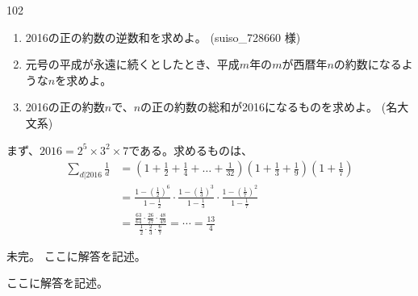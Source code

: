 \begin{prob}{102}{}{}
 \begin{enumerate}
  \item 2016の正の約数の逆数和を求めよ。  (suiso\_728660 様)
  \item 元号の平成が永遠に続くとしたとき、平成$m$年の$m$が西暦年$n$の約数になるような$n$を求めよ。 
  \item 2016の正の約数$n$で、$n$の正の約数の総和が2016になるものを求めよ。  (名大 文系)
 \end{enumerate}
\end{prob}

まず、$2016=2^5\times 3^2\times 7$である。求めるものは、
\begin{align*}
 \sum_{d|2016} \frac{1}{d} &= \left(1+\frac{1}{2}+\frac{1}{4}+\dots +\frac{1}{32}\right)\left(1+\frac{1}{3}+\frac{1}{9}\right)\left(1+\frac{1}{7}\right) \\
 &= \frac{1-\left(\frac{1}{2}\right)^6}{1-\frac{1}{2}}\cdot\frac{1-\left(\frac{1}{3}\right)^3}{1-\frac{1}{3}}\cdot\frac{1-\left(\frac{1}{7}\right)^2}{1-\frac{1}{7}} \\
 &= \frac{\frac{63}{64}\cdot\frac{26}{27}\cdot\frac{48}{49}}{\frac{1}{2}\cdot\frac{2}{3}\cdot\frac{6}{7}}=\cdots=\frac{13}{4}
\end{align*}

未完。
ここに解答を記述。

ここに解答を記述。
